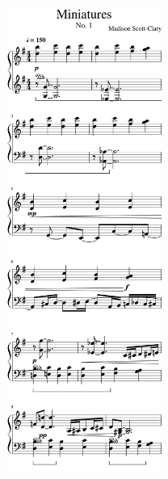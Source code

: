 \label{writing:music}
\begin{paracol}{2}
\begin{rightcolumn*}
  \begin{flushright}
\noindent\includegraphics[width=2in]{assets/static/miniatures/1-1.png}
\end{flushright}


\end{rightcolumn*}
\end{paracol}
